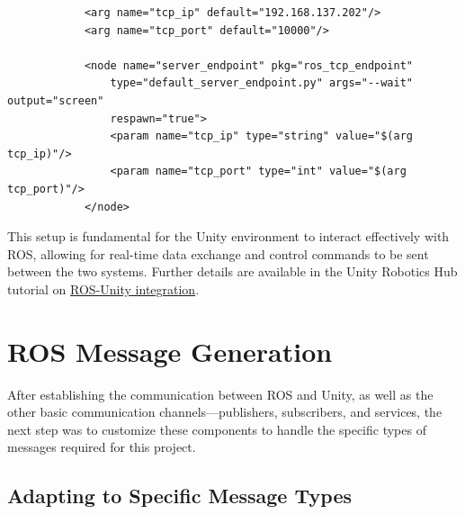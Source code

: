     \begin{verbatim}
            <arg name="tcp_ip" default="192.168.137.202"/>
            <arg name="tcp_port" default="10000"/>
            
            <node name="server_endpoint" pkg="ros_tcp_endpoint" 
                type="default_server_endpoint.py" args="--wait" output="screen" 
                respawn="true">
                <param name="tcp_ip" type="string" value="$(arg tcp_ip)"/>
                <param name="tcp_port" type="int" value="$(arg tcp_port)"/>
            </node>
    \end{verbatim}
    
    
    This setup is fundamental for the Unity environment to interact effectively with ROS, allowing for real-time data exchange and control commands to be sent between the two systems. Further details are available in the Unity Robotics Hub tutorial on \href{https://github.com/Unity-Technologies/Unity-Robotics-Hub/blob/main/tutorials/ros_unity_integration/network.md}{ROS-Unity integration}.
    
    \section{ROS Message Generation}
    
    After establishing the communication between ROS and Unity, as well as the other basic communication channels—publishers, subscribers, and services, the next step was to customize these components to handle the specific types of messages required for this project.
    
    \subsection{Adapting to Specific Message Types}
    
